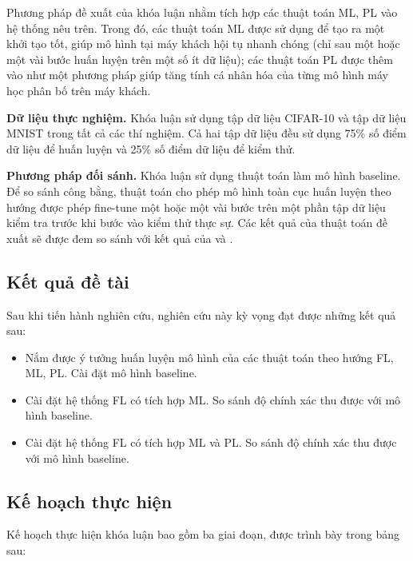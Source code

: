 Phương pháp đề xuất của khóa luận nhằm tích hợp các thuật toán ML, PL vào hệ thống nêu trên. Trong đó, các thuật toán ML được sử dụng để tạo ra một khởi tạo tốt, giúp mô hình tại máy khách hội tụ nhanh chóng (chỉ sau một hoặc một vài bước huấn luyện trên một số ít dữ liệu); các thuật toán PL được thêm vào như một phương pháp giúp tăng tính cá nhân hóa của từng mô hình máy học phân bố trên máy khách.

\textbf{Dữ liệu thực nghiệm.} Khóa luận sử dụng tập dữ liệu CIFAR-10 và tập dữ liệu MNIST trong tất cả các thí nghiệm. Cả hai tập dữ liệu đều sử dụng 75\% số điểm dữ liệu để huấn luyện và 25\% số điểm dữ liệu để kiểm thử.

\textbf{Phương pháp đối sánh.} Khóa luận sử dụng thuật toán  làm mô hình baseline. Để so sánh công bằng, thuật toán  cho phép mô hình toàn cục huấn luyện theo hướng  được phép fine-tune một hoặc một vài bước trên một phần tập dữ liệu kiểm tra trước khi bước vào kiểm thử thực sự. Các kết quả của thuật toán đề xuất sẽ được đem so sánh với kết quả của  và .

\subsection*{Kết quả đề tài}

Sau khi tiến hành nghiên cứu, nghiên cứu này kỳ vọng đạt được những kết quả sau:

\begin{itemize}
    \item Nắm được ý tưởng huấn luyện mô hình của các thuật toán theo hướng FL, ML, PL. Cài đặt mô hình baseline.
    \item Cài đặt hệ thống FL có tích hợp ML. So sánh độ chính xác thu được với mô hình baseline.
    \item Cài đặt hệ thống FL có tích hợp ML và PL. So sánh độ chính xác thu được với mô hình baseline.
\end{itemize}

\subsection*{Kế hoạch thực hiện}

Kế hoạch thực hiện khóa luận bao gồm ba giai đoạn, được trình bày trong bảng sau:

